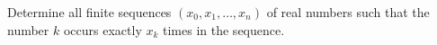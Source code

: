 Determine all finite sequences $(x_0,x_1,\ldots,x_n)$ of real numbers such
that the number $k$ occurs exactly $x_k$ times in the sequence.